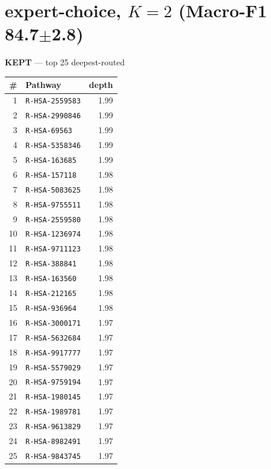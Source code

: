 \documentclass[10pt]{article}
\begin{document}
\section*{expert-choice, $K=2$  (Macro-F1 84.7$\pm$2.8)}
\filbreak
\begin{minipage}[t]{0.48\textwidth}\centering\textbf{\color{green!45!black}KEPT} --- top 25 deepest-routed\\[3pt]
\begin{tabular}{@{}r l r@{}}
\toprule
\# & Pathway & depth \\
\midrule
1 & \texttt{R-HSA-2559583} & 1.99 \\
2 & \texttt{R-HSA-2990846} & 1.99 \\
3 & \texttt{R-HSA-69563} & 1.99 \\
4 & \texttt{R-HSA-5358346} & 1.99 \\
5 & \texttt{R-HSA-163685} & 1.99 \\
6 & \texttt{R-HSA-157118} & 1.98 \\
7 & \texttt{R-HSA-5083625} & 1.98 \\
8 & \texttt{R-HSA-9755511} & 1.98 \\
9 & \texttt{R-HSA-2559580} & 1.98 \\
10 & \texttt{R-HSA-1236974} & 1.98 \\
11 & \texttt{R-HSA-9711123} & 1.98 \\
12 & \texttt{R-HSA-388841} & 1.98 \\
13 & \texttt{R-HSA-163560} & 1.98 \\
14 & \texttt{R-HSA-212165} & 1.98 \\
15 & \texttt{R-HSA-936964} & 1.98 \\
16 & \texttt{R-HSA-3000171} & 1.97 \\
17 & \texttt{R-HSA-5632684} & 1.97 \\
18 & \texttt{R-HSA-9917777} & 1.97 \\
19 & \texttt{R-HSA-5579029} & 1.97 \\
20 & \texttt{R-HSA-9759194} & 1.97 \\
21 & \texttt{R-HSA-1980145} & 1.97 \\
22 & \texttt{R-HSA-1989781} & 1.97 \\
23 & \texttt{R-HSA-9613829} & 1.97 \\
24 & \texttt{R-HSA-8982491} & 1.97 \\
25 & \texttt{R-HSA-9843745} & 1.97 \\
\bottomrule
\end{tabular}
\end{minipage}\hfill
\end{document}
